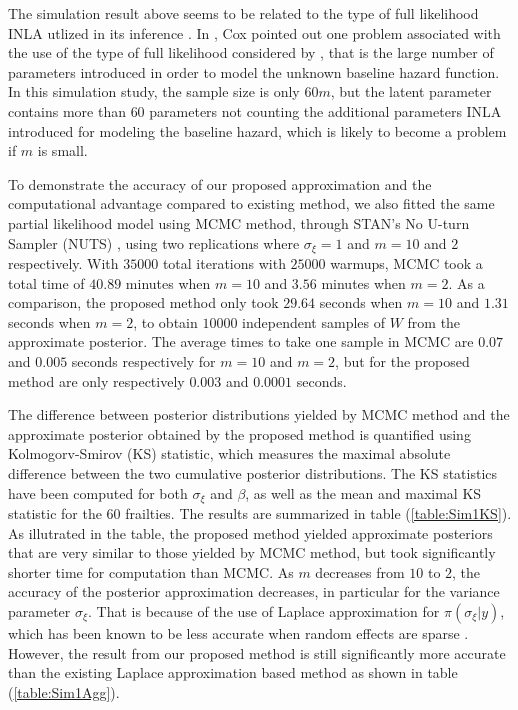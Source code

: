 \documentclass[ba]{imsart}
\begin{document}
The simulation result above seems to be related to the type of full likelihood INLA utlized in its inference \citep{inlacoxph}. In \cite{coxdiscussion}, Cox pointed out one problem associated with the use of the type of full likelihood considered by \cite{inlacoxph}, that is the large number of parameters introduced in order to model the unknown baseline hazard function. In this simulation study, the sample size is only $60m$, but the latent parameter contains more than $60$ parameters not counting the additional parameters INLA introduced for modeling the baseline hazard, which is likely to become a problem if $m$ is small. 

To demonstrate the accuracy of our proposed approximation and the computational advantage compared to existing method, we also fitted the same partial likelihood model using MCMC method, through STAN's No U-turn Sampler (NUTS) \citep{NUTS}, using two replications where $\sigma_\xi = 1$ and $m = 10$ and $2$ respectively. With $35000$ total iterations with $25000$ warmups, MCMC took a total time of $40.89$ minutes when $m = 10$ and $3.56$ minutes when $m = 2$. As a comparison, the proposed method only took $29.64$ seconds when $m = 10$ and $1.31$ seconds when $m = 2$, to obtain $10000$ independent samples of $W$ from the approximate posterior. The average times to take one sample in MCMC are $0.07$ and $0.005$ seconds respectively for $m = 10$ and $m = 2$, but for the proposed method are only respectively $0.003$ and 
$0.0001$ seconds.


The difference between posterior distributions yielded by MCMC method and the approximate posterior obtained by the proposed method is quantified using Kolmogorv-Smirov (KS) statistic, which measures the maximal absolute difference between the two cumulative posterior distributions. The KS statistics have been computed for both $\sigma_\xi$ and $\beta$, as well as the mean and maximal KS statistic for the $60$ frailties. The results are summarized in table (\ref{table:Sim1KS}). As illutrated in the table, the proposed method yielded approximate posteriors that are very similar to those yielded by MCMC method, but took significantly shorter time for computation than MCMC. As $m$ decreases from $10$ to $2$, the accuracy of the posterior approximation decreases, in particular for the variance parameter $\sigma_\xi$. That is because of the use of Laplace approximation for $\pi(\sigma_\xi|y)$, which has been known to be less accurate when random effects are sparse \citep{Ogden2013ASR}. However, the result from our proposed method is still significantly more accurate than the existing Laplace approximation based method as shown in table (\ref{table:Sim1Agg}).
\end{document}
